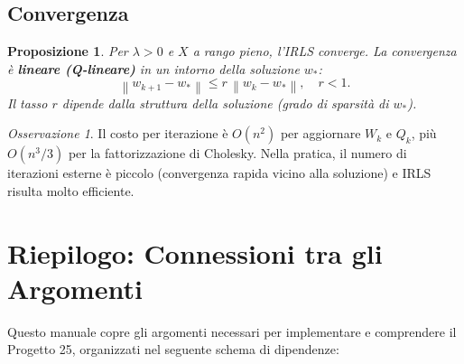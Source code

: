 \documentclass[11pt,a4paper]{article}
\theoremstyle{definition}
\theoremstyle{plain}
\newtheorem{proposition}{Proposizione}[section]
\theoremstyle{remark}
\newtheorem{remark}{Osservazione}[section]
\newcommand{\norm}[1]{\left\| #1 \right\|}
\begin{document}
\subsection{Convergenza}

\begin{proposition}
  Per $\lambda > 0$ e $X$ a rango pieno, l'IRLS converge. La convergenza è
  \textbf{lineare (Q-lineare)} in un intorno della soluzione $w_*$:
  \[
    \norm{w_{k+1} - w_*} \leq r\, \norm{w_k - w_*}, \quad r < 1.
  \]
  Il tasso $r$ dipende dalla struttura della soluzione (grado di sparsità di $w_*$).
\end{proposition}

\begin{remark}
  Il costo per iterazione è $O(n^2)$ per aggiornare $W_k$ e $Q_k$, più $O(n^3/3)$ per
  la fattorizzazione di Cholesky. Nella pratica, il numero di iterazioni esterne è piccolo
  (convergenza rapida vicino alla soluzione) e IRLS risulta molto efficiente.
\end{remark}

\section{Riepilogo: Connessioni tra gli Argomenti}
\label{sec:riepilogo}

Questo manuale copre gli argomenti necessari per implementare e comprendere il Progetto 25,
organizzati nel seguente schema di dipendenze:
\end{document}
